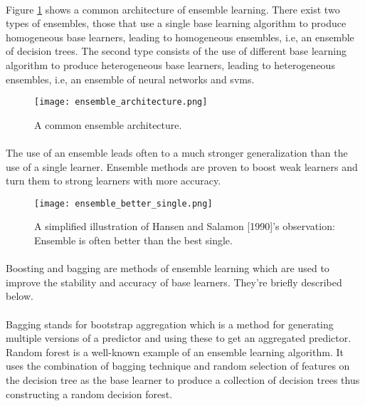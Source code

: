 \paragraph{}
Figure \ref{ensemble_architecture} shows a common architecture of ensemble learning. There exist two types of ensembles,  those that use a single base learning algorithm to produce homogeneous base learners, leading to homogeneous ensembles, i.e, an ensemble of decision trees. The second type consists of the use of different base learning algorithm to produce heterogeneous base learners, leading to heterogeneous ensembles, i.e, an ensemble of neural networks and \acs{svm}s.
\begin{figure}[ht]
 \texttt{[image: ensemble\_architecture.png]}
 \centering         
 \caption{A common ensemble architecture.}
 \label{ensemble_architecture}
\end{figure}
\paragraph{}
The use of an ensemble leads often to a much stronger generalization than the use of a single learner. Ensemble methods are proven to boost weak learners and turn them to strong learners with more accuracy.\cite{MLEL:1}
\begin{figure}[ht]
 \texttt{[image: ensemble\_better\_single.png]}
 \centering         
 \caption{A simplified illustration of Hansen and Salamon [1990]’s observation: Ensemble is often better than the best single.}
 \label{ensemble_better_single}
\end{figure}
\paragraph{}
Boosting and bagging are methods of ensemble learning which are used to improve the stability and accuracy of base learners. They're briefly described below.
\paragraph{}{Bagging}
 stands for bootstrap aggregation which is a method for generating multiple versions of a predictor and using these to get an aggregated predictor\cite{MLELBO:1}. Random forest is a well-known example of an ensemble learning algorithm. It uses the combination of bagging technique\cite{MLRF:1} and random selection of features on the decision tree as the base learner to produce a collection of decision trees thus constructing a random decision forest. 
